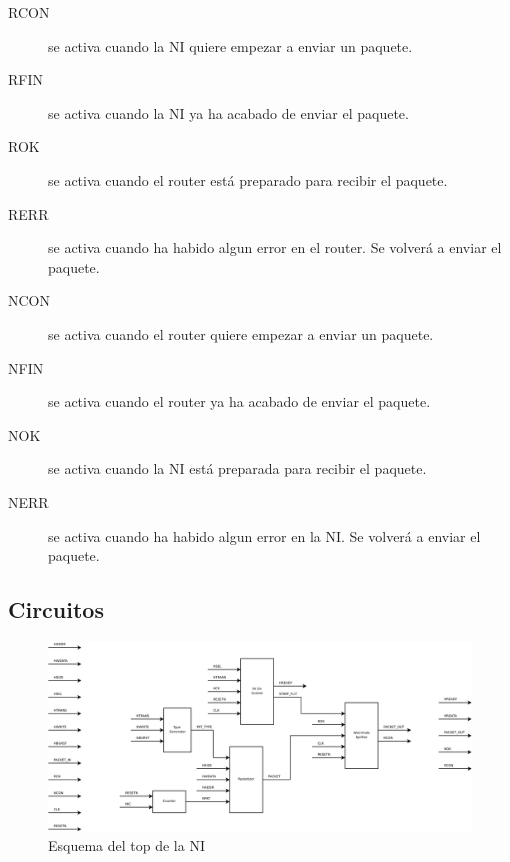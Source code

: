 \documentclass[a4paper, 12pt, babel, spanish]{article}
\begin{document}
\begin{description}
\item[RCON] se activa cuando la NI quiere empezar a enviar un paquete.
\item[RFIN] se activa cuando la NI ya ha acabado de enviar el paquete.
\item[ROK]  se activa cuando el router está preparado para recibir el paquete.
\item[RERR] se activa cuando ha habido algun error en el router. Se volverá a enviar el paquete.
\item[NCON] se activa cuando el router quiere empezar a enviar un paquete.
\item[NFIN] se activa cuando el router ya ha acabado de enviar el paquete.
\item[NOK]  se activa cuando la NI está preparada para recibir el paquete.
\item[NERR] se activa cuando ha habido algun error en la NI. Se volverá a enviar el paquete.
\end{description}

\newpage

\begin{landscape}
\subsection*{Circuitos}
\begin{figure}[h]
\centering
\includegraphics[width=1.5\textwidth]{fig/schem/NI}
\caption{Esquema del top de la NI}
\end{figure}
\end{landscape}
\end{document}
